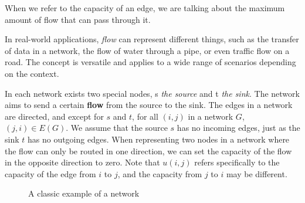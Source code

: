 When we refer to the capacity of an edge, we are talking about the maximum amount of flow that can pass through it.

In real-world applications, \textit{flow} can represent different things, such as the transfer of data in a network, the flow of water through a pipe, or even traffic flow on a road. The concept is versatile and applies to a wide range of scenarios depending on the context.

In each network exists two special nodes, s \textit{the source} and t \textit{the sink}. The network aims to send a certain \textbf{flow} from the source to the sink.
The edges in a network are directed, and except for $s$ and $t$, for all $(i,j)$ in a network $G$, $(j,i) \in E(G)$. We assume that the source $s$ has no incoming edges, just as the sink $t$ has no outgoing edges.
When representing two nodes in a network where the flow can only be routed in one direction, we can set the capacity of the flow in the opposite direction to zero.
Note that $u(i,j)$ refers specifically to the capacity of the edge from $i$ to $j$, and the capacity from $j$ to $i$ may be different.

\begin{figure}[h]
    \centering
    \caption{A classic example of a network}
\end{figure}



